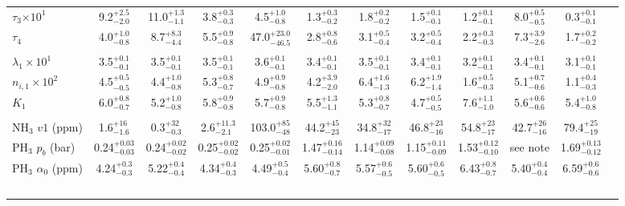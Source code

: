 \documentclass[article,11pt]{emulateapj}
\def\pht{PH$_3$ }
\def\nht{NH$_3$ }
\begin{document}
\begin{table*}[!htb]
\begin{scriptsize}
\begin{tabular}{l c c c c c c c c c c c}
    $\tau_3$$\times 10^1$ &   9.2$^{+  2.5}_{-  2.0}$ &  11.0$^{+  1.3}_{-  1.1}$ &   3.8$^{+  0.3}_{-  0.3}$ &   4.5$^{+  1.0}_{-  0.8}$ &   1.3$^{+  0.3}_{-  0.2}$ &   1.8$^{+  0.2}_{-  0.2}$ &   1.5$^{+  0.1}_{-  0.1}$ &   1.2$^{+  0.1}_{-  0.1}$ &   8.0$^{+  0.5}_{-  0.5}$ &   0.3$^{+  0.1}_{-  0.1}$\\[0.05in]
                 $\tau_4$ &   4.0$^{+  1.0}_{-  0.8}$ &   8.7$^{+  8.3}_{-  4.4}$ &   5.5$^{+  0.9}_{-  0.8}$ &  47.0$^{+ 23.0}_{- 46.5}$ &   2.8$^{+  0.8}_{-  0.6}$ &   3.1$^{+  0.5}_{-  0.4}$ &   3.2$^{+  0.5}_{-  0.4}$ &   2.2$^{+  0.3}_{-  0.3}$ &   7.3$^{+  3.9}_{-  2.6}$ &   1.7$^{+  0.2}_{-  0.2}$\\[0.05in]
\hline\\[-0.1in]
       $\lambda_1\times 10^1$ &   3.5$^{+  0.1}_{-  0.1}$ &   3.5$^{+  0.1}_{-  0.1}$ &   3.5$^{+  0.1}_{-  0.1}$ &   3.6$^{+  0.1}_{-  0.1}$ &   3.4$^{+  0.1}_{-  0.1}$ &   3.5$^{+  0.1}_{-  0.1}$ &   3.4$^{+  0.1}_{-  0.1}$ &   3.2$^{+  0.1}_{-  0.1}$ &   3.4$^{+  0.1}_{-  0.1}$ &   3.1$^{+  0.1}_{-  0.1}$\\[0.05in]
       $n_{i,1}\times 10^2$ &   4.5$^{+  0.5}_{-  0.5}$ &   4.4$^{+  1.0}_{-  0.8}$ &   5.3$^{+  0.8}_{-  0.7}$ &   4.9$^{+  0.9}_{-  0.8}$ &   4.2$^{+  3.9}_{-  2.0}$ &   6.4$^{+  1.6}_{-  1.3}$ &   6.2$^{+  1.9}_{-  1.4}$ &   1.6$^{+  0.5}_{-  0.3}$ &   5.1$^{+  0.7}_{-  0.6}$ &   1.1$^{+  0.4}_{-  0.3}$\\[0.05in]
                      $K_1$ &   6.0$^{+  0.8}_{-  0.7}$ &   5.2$^{+  1.0}_{-  0.8}$ &   5.8$^{+  0.9}_{-  0.8}$ &   5.7$^{+  0.9}_{-  0.8}$ &   5.5$^{+  1.3}_{-  1.1}$ &   5.3$^{+  0.8}_{-  0.7}$ &   4.7$^{+  0.5}_{-  0.5}$ &   7.6$^{+  1.1}_{-  1.0}$ &   5.6$^{+  0.6}_{-  0.6}$ &   5.4$^{+  1.0}_{-  0.8}$\\[0.05in]
\hline\\[-0.1in]
       \nht$v1$ (ppm) &   1.6$^{+16}_{-  1.6}$ &   0.3$^{+32}_{-  0.3}$ &   2.6$^{+ 11.3}_{-  2.1}$ & 103.0$^{+ 85}_{- 48}$ &  44.2$^{+ 45}_{- 23}$ &  34.8$^{+ 32}_{- 17}$ &  46.8$^{+ 23}_{- 16}$ &  54.8$^{+ 23}_{- 17}$ &  42.7$^{+ 26}_{- 16}$ &  79.4$^{+ 25}_{- 19}$\\[0.05in]
         \pht $p_b$ (bar) &  0.24$^{+ 0.03}_{- 0.03}$ &  0.24$^{+ 0.02}_{- 0.02}$ &  0.25$^{+ 0.02}_{- 0.02}$ &  0.25$^{+ 0.02}_{- 0.01}$ &  1.47$^{+ 0.16}_{- 0.14}$ &  1.14$^{+ 0.09}_{- 0.08}$ &  1.15$^{+ 0.11}_{- 0.09}$ &  1.53$^{+ 0.12}_{- 0.10}$ &  see note &  1.69$^{+ 0.13}_{- 0.12}$\\[0.05in]
     \pht $\alpha_0$ (ppm) &  4.24$^{+ 0.3}_{- 0.3}$ &  5.22$^{+ 0.4}_{- 0.4}$ &  4.34$^{+ 0.4}_{- 0.3}$ &  4.49$^{+ 0.5}_{- 0.4}$ &  5.60$^{+ 0.8}_{- 0.7}$ &  5.57$^{+ 0.6}_{- 0.5}$ &  5.60$^{+ 0.6}_{- 0.5}$ &  6.43$^{+ 0.8}_{- 0.7}$ &  5.40$^{+ 0.4}_{- 0.4}$ &  6.59$^{+ 0.6}_{- 0.6}$\\[0.05in]
$$
\end{tabular}
\end{scriptsize}
\end{table*}
\end{document}
